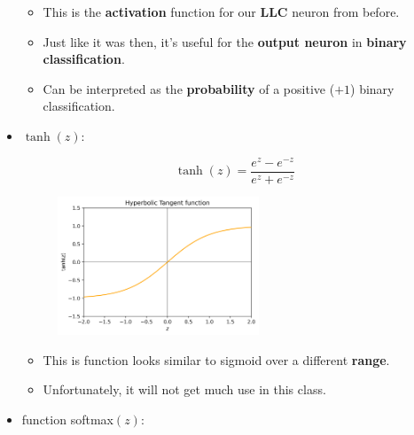 \begin{itemize}
                \begin{itemize}
                    \item This is the \textbf{activation} function for our \textbf{LLC} neuron from before.
                    
                    \item Just like it was then, it's useful for the \textbf{output neuron} in \textbf{binary classification}.
                    
                    \item Can be interpreted as the \textbf{probability} of a positive ($+1$) binary classification.
                \end{itemize}
                
            \item {} $\tanh(z)$:    
                
                \begin{equation}
                    \tanh(z) = \frac{e^z - e^{-z}}{e^z + e^{-z}}
                \end{equation}
                
                \begin{figure}[H]
                    \centering
                    \includegraphics[width=60mm,scale=0.4]{images/nn_images/tanh_fn.png}
                \end{figure}
                
                \begin{itemize}
                    \item This is function looks similar to sigmoid over a different \textbf{range}.
                    
                    \item Unfortunately, it will not get much use in this class.
                \end{itemize}
                
            \item {} function softmax$(z)$:
                

\end{itemize}
